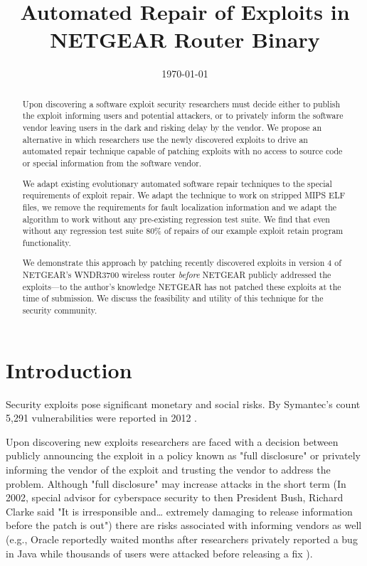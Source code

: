 \documentclass{sigcomm-alternate}
\date{\today}
\title{Automated Repair of Exploits in NETGEAR Router Binary}
\begin{document}
\maketitle
\usetikzlibrary{arrows,decorations,decorations.pathreplacing,shapes}

\begin{abstract}
Upon discovering a software exploit security researchers must decide
either to publish the exploit informing users and potential attackers,
or to privately inform the software vendor leaving users in the dark
and risking delay by the vendor.  We propose an alternative in which
researchers use the newly discovered exploits to drive an automated
repair technique capable of patching exploits with no access to source
code or special information from the software vendor.

We adapt existing evolutionary automated software repair techniques to
the special requirements of exploit repair.  We adapt the technique to
work on stripped MIPS ELF files, we remove the requirements for fault
localization information and we adapt the algorithm to work without
any pre-existing regression test suite.  We find that even without any
regression test suite 80\% of repairs of our example exploit retain
program functionality.

We demonstrate this approach by patching recently discovered exploits
in version 4 of NETGEAR's WNDR3700 wireless router \emph{before} NETGEAR
publicly addressed the exploits---to the author's knowledge NETGEAR
has not patched these exploits at the time of submission.  We discuss
the feasibility and utility of this technique for the security
community.
\end{abstract}

\section{Introduction}
\label{sec-1}
Security exploits pose significant monetary and social risks.  By
Symantec's count 5,291 vulnerabilities were reported in 2012
\cite{symantec2013threat}.

Upon discovering new exploits researchers are faced with a decision
between publicly announcing the exploit in a policy known as "full
disclosure" or privately informing the vendor of the exploit and
trusting the vendor to address the problem.  Although "full
disclosure" may increase attacks in the short term (In 2002, special
advisor for cyberspace security to then President Bush, Richard Clarke
said "It is irresponsible and\ldots{} extremely damaging to release
information before the patch is out") there are risks associated with
informing vendors as well (e.g., Oracle reportedly waited months after
researchers privately reported a bug in Java while thousands of users
were attacked before releasing a fix \cite{greenberg2012oracle}).
\end{document}
